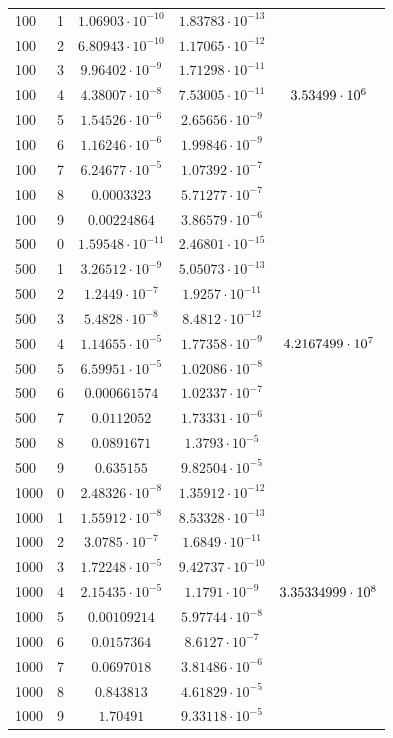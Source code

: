 \documentclass[english]{article}
\begin{document}
\begin{center}
\begin{longtable}{l|l|c|c|c}
    100 & 1 & \(1.06903\cdot 10^{-10} \)& \(1.83783\cdot 10^{-13}\) & \\
    100 & 2 & \(6.80943\cdot 10^{-10} \)& \(1.17065\cdot 10^{-12}\) & \\
    100 & 3 & \(9.96402\cdot 10^{-9} \)& \(1.71298\cdot 10^{-11}\) & \\
    100 & 4 & \(4.38007\cdot 10^{-8} \)& \(7.53005\cdot 10^{-11}\) & \({\large 3.53499\cdot 10^6}\) \\
    100 & 5 & \(1.54526\cdot 10^{-6} \)& \(2.65656\cdot 10^{-9}\) & \\
    100 & 6 & \(1.16246\cdot 10^{-6} \)& \(1.99846\cdot 10^{-9}\) & \\
    100 & 7 & \(6.24677\cdot 10^{-5} \)& \(1.07392\cdot 10^{-7}\) & \\
    100 & 8 & \(0.0003323   \)& \(5.71277\cdot 10^{-7}\) & \\
    100 & 9 & \(0.00224864  \)& \(3.86579\cdot 10^{-6}\) & \\
    \hline
    500 & 0 & \(1.59548\cdot 10^{-11} \)& \(2.46801\cdot 10^{-15}\) & \\
    500 & 1 & \(3.26512\cdot 10^{-9} \)& \(5.05073\cdot 10^{-13}\) & \\
    500 & 2 & \(1.2449\cdot 10^{-7}  \)& \(1.9257\cdot 10^{-11}\) & \\
    500 & 3 & \(5.4828\cdot 10^{-8}  \)& \(8.4812\cdot 10^{-12}\) & \\
    500 & 4 & \(1.14655\cdot 10^{-5} \)& \(1.77358\cdot 10^{-9}\) & \({\large 4.2167499 \cdot 10^{7}}\) \\
    500 & 5 & \(6.59951\cdot 10^{-5} \)& \(1.02086\cdot 10^{-8}\) & \\
    500 & 6 & \(0.000661574 \)& \(1.02337\cdot 10^{-7}\) & \\
    500 & 7 & \(0.0112052   \)& \(1.73331\cdot 10^{-6}\) & \\
    500 & 8 & \(0.0891671   \)& \(1.3793\cdot 10^{-5}\) & \\
    500 & 9 & \(0.635155    \)& \(9.82504\cdot 10^{-5}\) & \\
    \hline
    1000 & 0 & \(2.48326\cdot 10^{-8} \)& \(1.35912\cdot 10^{-12}\) & \\
    1000 & 1 & \(1.55912\cdot 10^{-8} \)& \(8.53328\cdot 10^{-13}\) & \\
    1000 & 2 & \(3.0785\cdot 10^{-7}  \)& \(1.6849\cdot 10^{-11}\) & \\
    1000 & 3 & \(1.72248\cdot 10^{-5} \)& \(9.42737\cdot 10^{-10}\) & \\
    1000 & 4 & \(2.15435\cdot 10^{-5} \)& \(1.1791\cdot 10^{-9}\) & \({\large 3.35334999 \cdot 10^8 }\) \\
    1000 & 5 & \(0.00109214  \)& \(5.97744\cdot 10^{-8}\) & \\
    1000 & 6 & \(0.0157364   \)& \(8.6127\cdot 10^{-7}\) & \\
    1000 & 7 & \(0.0697018   \)& \(3.81486\cdot 10^{-6}\) & \\
    1000 & 8 & \(0.843813    \)& \(4.61829\cdot 10^{-5}\) & \\
    1000 & 9 & \(1.70491     \)& \(9.33118\cdot 10^{-5}\)
  \end{longtable}
\end{center}
\end{document}
